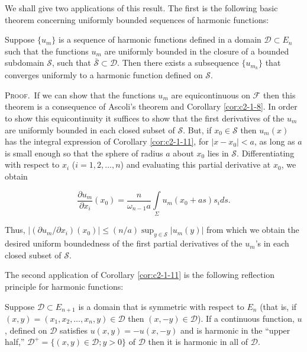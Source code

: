 We shall give two applications of this result. The first is the following basic theorem concerning uniformly bounded sequences of harmonic functions:

\begin{theorem}
\label{thm:c2-1-12}
Suppose $\{u_m\}$ is a sequence of harmonic functions defined in a domain $\mathcal{D} \subset E_n$ such that the functions $u_m$ are uniformly bounded in the closure of a bounded subdomain $\mathcal{S}$, such that $\bar{\mathcal{S}} \subset \mathcal{D}$. Then there exists a subsequence $\{u_{m_k}\}$ that converges uniformly to a harmonic function defined on $\mathcal{S}$.
\end{theorem}

\textsc{Proof.}\ If we can show that the functions $u_m$ are equicontinuous on $\mathcal{F}$ then this theorem is a consequence of Ascoli's theorem and Corollary \ref{cor:c2-1-8}. In order to show this equicontinuity it suffices to show that the first derivatives of the $u_m$ are uniformly bounded in each closed subset of $\mathcal{S}$. But, if $x_0 \in \mathcal{S}$ then $u_m(x)$ has the integral expression of Corollary \ref{cor:c2-1-11}, for $|x - x_0| < a$, as long as $a$ is small enough so that the sphere of radius $a$ about $x_0$ lies in $\mathcal{S}$. Differentiating with respect to $x_i$ ($i = 1, 2, \ldots, n$) and evaluating this partial derivative at $x_0$, we obtain

\[
\frac{\partial u_{m}}{\partial x_{i}}\left(x_{0}\right)=\frac{n}{\omega_{n-1}a}\int\limits_{\Sigma}u_{m}(x_{0}+a s)s_{i}d s.
\]

Thus, $|(\partial u_m/\partial x_i)(x_0)| \leq (n/a) \sup_{y \in \mathcal{S}} |u_m(y)|$ from which we obtain the desired uniform boundedness of the first partial derivatives of the $u_m$'s in each closed subset of $\mathcal{S}$.

The second application of Corollary \ref{cor:c2-1-11} is the following reflection principle for harmonic functions:

\begin{theorem}
\label{thm:c2-1-13}
Suppose $\mathcal{D} \subset E_{n+1}$ is a domain that is symmetric with respect to $E_n$ (that is, if $(x, y) = (x_1, x_2, \ldots, x_n, y) \in \mathcal{D}$ then $(x, -y) \in \mathcal{D}$). If a continuous function, $u$, defined on $\mathcal{D}$ satisfies $u(x, y) = -u(x, -y)$ and is harmonic in the ``upper half,'' $\mathcal{D}^+ = \{(x, y) \in \mathcal{D}; y > 0\}$ of $\mathcal{D}$ then it is harmonic in all of $\mathcal{D}$.
\end{theorem}

